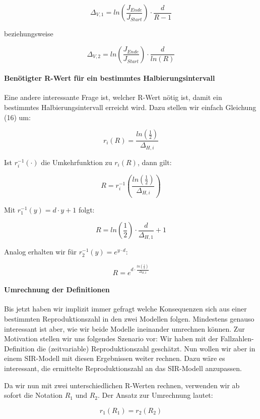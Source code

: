\documentclass[a4paper]{article}
\begin{document}
    $$ \Delta_{V,1} = ln(\frac{J_{Ende}}{J_{Start}}) \cdot \frac{d}{R-1} $$

    beziehungsweise 

    $$ \Delta_{V,2} = ln(\frac{J_{Ende}}{J_{Start}}) \cdot \frac{d}{ln(R)} $$

    \paragraph{Benötigter R-Wert für ein bestimmtes Halbierungsintervall}Eine andere interessante Frage ist, welcher R-Wert nötig ist, damit ein bestimmtes Halbierungsintervall erreicht wird. Dazu stellen wir einfach Gleichung (16) um: 

    $$ r_i(R) = \frac{ln(\frac{1}{2})}{\Delta_{H,i}} $$

    Ist $r_i^{-1}(\cdot)$ die Umkehrfunktion zu $r_i(R)$, dann gilt: 

    \begin{equation}
        R = r_i^{-1}(\frac{ln(\frac{1}{2})}{\Delta_{H,i}})
    \end{equation}

    Mit $r_1^{-1}(y) = d \cdot y + 1 $ folgt: 

    $$ R = ln(\frac{1}{2}) \cdot \frac{d}{\Delta_{H,1}} + 1 $$

    Analog erhalten wir für $r_2^{-1}(y) = e^{y \cdot d}$:

    $$ R = e^{ d \cdot \frac{ln(\frac{1}{2})}{\Delta_{H,2}} } $$




    \paragraph{Umrechnung der Definitionen}Bis jetzt haben wir implizit immer gefragt welche Konsequenzen sich aus einer bestimmten Reproduktionszahl in den zwei Modellen folgen. Mindestens genauso interessant ist aber, wie wir beide Modelle ineinander umrechnen können. Zur Motivation stellen wir uns folgendes Szenario vor: Wir haben mit der Fallzahlen-Definition die (zeitvariable) Reproduktionszahl geschätzt. Nun wollen wir aber in einem SIR-Modell mit diesen Ergebnissen weiter rechnen. Dazu wäre es interessant, die ermittelte Reproduktionszahl an das SIR-Modell anzupassen. 

    Da wir nun mit zwei unterschiedlichen R-Werten rechnen, verwenden wir ab sofort die Notation $R_1$ und $R_2$. Der Ansatz zur Umrechnung lautet: 

    \begin{equation}
        r_1(R_1) = r_2(R_2)
    \end{equation}
\end{document}
